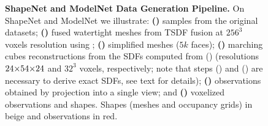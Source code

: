\begin{figure}[t]
\begin{subfigure}[t]{0.32\textwidth}
\begin{subfigure}[t]{0.32\textwidth}
   		\end{subfigure}
		\label{fig:data-shapenet-modelnet-f}
	\end{subfigure}
    \vspace*{-\figskipcaption px}
	\caption{{\bf ShapeNet and ModelNet Data Generation Pipeline.} On ShapeNet and ModelNet we illustrate: {\bf ()} samples from the original datasets; {\bf ()} fused watertight meshes from TSDF fusion at $256^3$ voxels resolution using \citep{Riegler2017THREEDV}; {\bf ()} simplified meshes ($5k$ faces); {\bf ()} marching cubes \citep{Lorensen1987SIGGRAPH} reconstructions from the SDFs computed from () (resolutions $24 \operatorname*{\!\times\!} 54 \operatorname*{\!\times\!} 24$ and $32^3$ voxels, respectively; note that steps () and () are necessary to derive exact SDFs, see text for details); {\bf ()} observations obtained by projection into a single view; and {\bf ()} voxelized observations and shapes. Shapes (meshes and occupancy grids) {in \color{rbeige}beige} and observations in {\color{rred}red}.}
	\label{fig:data-shapenet-modelnet}
    \vspace*{-\figskipbelow px}
\end{figure}